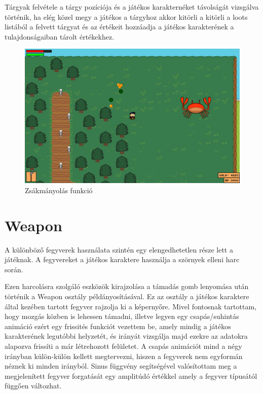 Tárgyak felvétele a tárgy pozíciója és a játékos karakternéket távolságát vizsgálva történik, ha elég közel megy a játékos a tárgyhoz akkor kitörli a kitörli a loots listából a felvett tárgyat és az értékeit hozzáadja a játékos karakterének a tulajdonságaiban tárolt értékekhez.

\begin{figure}[H]
    \centering
    \includegraphics[width=15.5truecm]{images/loots.png}
    \caption{Zsákmányolás funkció}
    \label{fig:Zsákmányolás funkció}
\end{figure}


\section{Weapon}

A különböző fegyverek használata szintén egy elengedhetetlen része lett a játéknak. A fegyvereket a játékos karaktere használja a szörnyek elleni harc során. 

Ezen harcolásra szolgáló eszközök kirajzolása a támadás gomb lenyomása után történik a Weapon osztály példányosításával. Ez az osztály a játékos karaktere által kezében tartott fegyver rajzolja ki a képernyőre. Mivel fontosnak tartottam, hogy mozgás közben is lehessen támadni, illetve legyen egy csapás/suhintás animáció ezért egy frissités funkciót vezettem be, amely mindig a játékos karakterének legutóbbi helyzetét, és irányát vizsgálja majd ezekre az adatokra alapozva frissíti a már létrehozott felületet. A csapás animációt mind a négy irányban külön-külön kellett megtervezni, hiszen a fegyverek nem egyformán néznek ki minden irányból. Sinus függvény segítségével valósítottam meg a megjelenített fegyver forgatását egy amplitúdó értékkel amely a fegyver típusától függően változhat.

